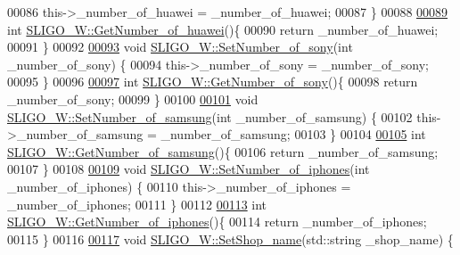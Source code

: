 \begin{DoxyCode}
00086     this->\_number\_of\_huawei = \_number\_of\_huawei;
00087 \}
00088 
\hypertarget{_s_l_i_g_o___w_8cpp_source.tex_l00089}{}\hyperlink{class_s_l_i_g_o___w_a5804f623f4eb290df4f6b3aba59230d6}{00089} \textcolor{keywordtype}{int} \hyperlink{class_s_l_i_g_o___w_a5804f623f4eb290df4f6b3aba59230d6}{SLIGO\_W::GetNumber\_of\_huawei}()\{
00090     \textcolor{keywordflow}{return} \_number\_of\_huawei;
00091 \}
00092 
\hypertarget{_s_l_i_g_o___w_8cpp_source.tex_l00093}{}\hyperlink{class_s_l_i_g_o___w_abbfe7001333b8c0b57a22f09ec4c3c1d}{00093} \textcolor{keywordtype}{void} \hyperlink{class_s_l_i_g_o___w_abbfe7001333b8c0b57a22f09ec4c3c1d}{SLIGO\_W::SetNumber\_of\_sony}(\textcolor{keywordtype}{int} \_number\_of\_sony) \{
00094     this->\_number\_of\_sony = \_number\_of\_sony;
00095 \}
00096 
\hypertarget{_s_l_i_g_o___w_8cpp_source.tex_l00097}{}\hyperlink{class_s_l_i_g_o___w_a62822c4fb80f739bee61767238a29e14}{00097} \textcolor{keywordtype}{int} \hyperlink{class_s_l_i_g_o___w_a62822c4fb80f739bee61767238a29e14}{SLIGO\_W::GetNumber\_of\_sony}()\{
00098     \textcolor{keywordflow}{return} \_number\_of\_sony;
00099 \}
00100 
\hypertarget{_s_l_i_g_o___w_8cpp_source.tex_l00101}{}\hyperlink{class_s_l_i_g_o___w_ace5a2d4fae4c84710a648062e60022d2}{00101} \textcolor{keywordtype}{void} \hyperlink{class_s_l_i_g_o___w_ace5a2d4fae4c84710a648062e60022d2}{SLIGO\_W::SetNumber\_of\_samsung}(\textcolor{keywordtype}{int} \_number\_of\_samsung) \{
00102     this->\_number\_of\_samsung = \_number\_of\_samsung;
00103 \}
00104 
\hypertarget{_s_l_i_g_o___w_8cpp_source.tex_l00105}{}\hyperlink{class_s_l_i_g_o___w_aa4b6200a00c2a14924b7ff1ae3896b61}{00105} \textcolor{keywordtype}{int} \hyperlink{class_s_l_i_g_o___w_aa4b6200a00c2a14924b7ff1ae3896b61}{SLIGO\_W::GetNumber\_of\_samsung}()\{
00106     \textcolor{keywordflow}{return} \_number\_of\_samsung;
00107 \}
00108 
\hypertarget{_s_l_i_g_o___w_8cpp_source.tex_l00109}{}\hyperlink{class_s_l_i_g_o___w_ad2f09386c9305c63a94ab171861eb3a9}{00109} \textcolor{keywordtype}{void} \hyperlink{class_s_l_i_g_o___w_ad2f09386c9305c63a94ab171861eb3a9}{SLIGO\_W::SetNumber\_of\_iphones}(\textcolor{keywordtype}{int} \_number\_of\_iphones) \{
00110     this->\_number\_of\_iphones = \_number\_of\_iphones;
00111 \}
00112 
\hypertarget{_s_l_i_g_o___w_8cpp_source.tex_l00113}{}\hyperlink{class_s_l_i_g_o___w_a780b3a690f5cbbf7593ffc6612b3d743}{00113} \textcolor{keywordtype}{int} \hyperlink{class_s_l_i_g_o___w_a780b3a690f5cbbf7593ffc6612b3d743}{SLIGO\_W::GetNumber\_of\_iphones}()\{
00114     \textcolor{keywordflow}{return} \_number\_of\_iphones;
00115 \}
00116 
\hypertarget{_s_l_i_g_o___w_8cpp_source.tex_l00117}{}\hyperlink{class_s_l_i_g_o___w_ad2a9668f07e63bed2bb5da576cbb55b7}{00117} \textcolor{keywordtype}{void} \hyperlink{class_s_l_i_g_o___w_ad2a9668f07e63bed2bb5da576cbb55b7}{SLIGO\_W::SetShop\_name}(std::string \_shop\_name) \{

\end{DoxyCode}
